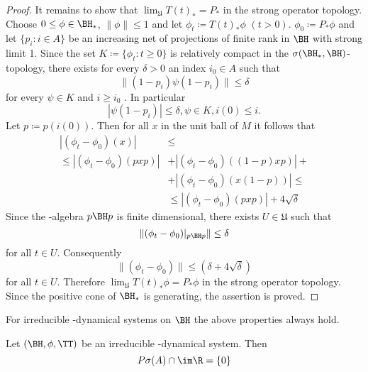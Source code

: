 \begin{proof}
It remains to show that $ \lim_{\mathfrak{U}} T(t)_{*} = P_{*} $  in the strong operator topology.
Choose $ 0 \leq \phi \in \BH_{*} $, $ \|\phi\| \leq 1 $  and let $ \phi_{t} \coloneqq T(t)_{*}\phi $  $ (t>0) $.
%
$ \phi_{0} \coloneqq P_{*}\phi $  and let $ \{p_{i}: i \in A\} $  be an increasing net of projections of finite rank in $ \BH $  with strong limit 1.
Since the set $ K \coloneqq \{\phi_{t}: t \geq 0\} $  is relatively compact in the $ \sigma(\BH_{*},\BH) $-topology, there exists for every $ \delta > 0 $  an index $ i_{0} \in A $  such that
\[
\|(1 - p_{i})\psi(1 - p_{i})\| \leq \delta
\]
for every $ \psi \in K $  and $ i \geq i_{0} $  \citet[Theorem III.5.4.(vi)]{takesaki:1979}.
In particular
\[
|\psi(1 - p_{i})| \leq \delta, \psi \in K, i(0) \leq i.
\]
Let $ p \coloneqq p(i(0)) $.
Then for all $ x $  in the unit ball of $ M $  it follows that
\begin{align*}
|(\phi_{t} - \phi_{0})(x)| &\leq \\
\leq |(\phi_{t} - \phi_{0})(pxp)| &+ |(\phi_{t} - \phi_{0})((1-p)xp)| + \\
&+ |(\phi_{t} - \phi_{0})(x(1-p))| \leq \\
&\leq |(\phi_{t} - \phi_{0})(pxp)| + 4\sqrt{\delta} 
\end{align*}
Since the \WA-algebra $ p \BH p $  is finite dimensional, there exists $ U \in \mathfrak{U} $  such that
\[
	\|(\phi_{t} - \phi_{0})|_{p \BH p}\| \leq \delta
\]
for all $ t \in U $.
Consequently
\[
\|(\phi_{t} - \phi_{0})\| \leq (\delta + 4\sqrt{\delta})
\]
for all $ t \in U $.
Therefore $ \lim_{\mathfrak{U}} T(t)_{*}\phi = P_{*}\phi $  in the strong operator topology.
Since the positive cone of $ \BH_{*} $  is generating, the assertion is proved.
\end{proof}
For irreducible \WA-dynamical systems on $ \BH $  the above properties always hold.
\begin{theorem}\label{thm:d4-3.8}
Let $ (\BH,\phi,\TT) $  be an irreducible \WA-dynamical system.
Then
\[
P\sigma(A) \cap \im\R = \{0\}
\]
\end{theorem}
%
